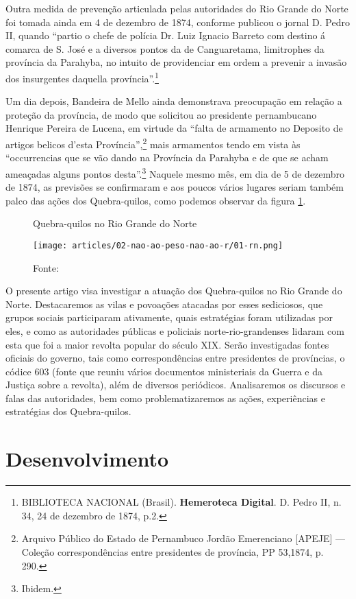 \begin{refsection}
Outra medida de prevenção articulada pelas autoridades do Rio Grande do Norte foi tomada ainda em 4 de dezembro de 1874, conforme publicou o jornal D. Pedro II, quando “partio o chefe de polícia Dr. Luiz Ignacio Barreto com destino á comarca de S. José e a diversos pontos da de Canguaretama, limitrophes da província da Parahyba, no intuito de providenciar em ordem a prevenir a invasão dos insurgentes daquella província”.\footnote{BIBLIOTECA NACIONAL (Brasil). \textbf{Hemeroteca Digital}. D. Pedro II, n. 34, 24 de dezembro de 1874, p.2. }

Um dia depois, Bandeira de Mello ainda demonstrava preocupação em relação a proteção da província, de modo que solicitou ao presidente pernambucano Henrique Pereira de Lucena, em virtude da “falta de armamento no Deposito de artigos belicos d’esta Província”,\footnote{Arquivo Público do Estado de Pernambuco Jordão Emerenciano [APEJE] --- Coleção correspondências entre presidentes de província, PP 53,1874, p. 290.} mais armamentos tendo em vista às “occurrencias que se vão dando na Província da Parahyba e de que se acham ameaçadas alguns pontos desta”.\footnote{Ibidem.} Naquele mesmo mês, em dia de 5 de dezembro de 1874, as previsões se confirmaram e aos poucos vários lugares seriam também palco das ações dos Quebra-quilos, como podemos observar da figura \ref{fig:quebra-quilo-rn}. 

\begin{figure}[ht]%
    \centering%
    \caption{Quebra-quilos no Rio Grande do Norte}%
    \texttt{[image: articles/02-nao-ao-peso-nao-ao-r/01-rn.png]}%
    \caption*{Fonte: \textcite[p.~17]{Monteiro1993}}%
    \label{fig:quebra-quilo-rn}%
\end{figure}%

O presente artigo visa investigar a atuação dos Quebra-quilos no Rio Grande do Norte. Destacaremos as vilas e povoações atacadas por esses sediciosos, que grupos sociais participaram ativamente, quais estratégias foram utilizadas por eles, e como as autoridades públicas e policiais norte-rio-grandenses lidaram com esta que foi a maior revolta popular do século XIX. Serão investigadas fontes oficiais do governo, tais como correspondências entre presidentes de províncias, o códice 603 (fonte que reuniu vários documentos ministeriais da Guerra e da Justiça sobre a revolta), além de diversos periódicos. Analisaremos os discursos e falas das autoridades, bem como problematizaremos as ações, experiências e estratégias dos Quebra-quilos.

\section{Desenvolvimento}


\end{refsection}
